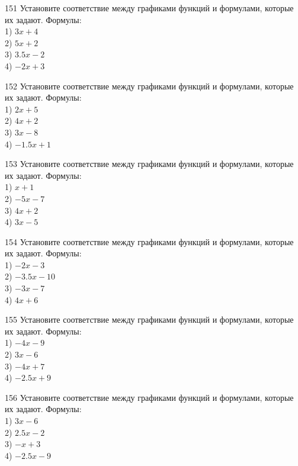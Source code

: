 \documentclass[4apaper]{article}
\begin{document}
\begin{taskBN}{151}
Установите соответствие между графиками функций и формулами, которые их задают. Формулы: \\1) $3x+4$\\2) $5x+2$\\3) $3.5x-2$\\4) $-2x+3$
\end{taskBN}

\begin{taskBN}{152}
Установите соответствие между графиками функций и формулами, которые их задают. Формулы: \\1) $2x+5$\\2) $4x+2$\\3) $3x-8$\\4) $-1.5x+1$
\end{taskBN}

\begin{taskBN}{153}
Установите соответствие между графиками функций и формулами, которые их задают. Формулы: \\1) $x+1$\\2) $-5x-7$\\3) $4x+2$\\4) $3x-5$
\end{taskBN}

\begin{taskBN}{154}
Установите соответствие между графиками функций и формулами, которые их задают. Формулы: \\1) $-2x-3$\\2) $-3.5x-10$\\3) $-3x-7$\\4) $4x+6$
\end{taskBN}

\begin{taskBN}{155}
Установите соответствие между графиками функций и формулами, которые их задают. Формулы: \\1) $-4x-9$\\2) $3x-6$\\3) $-4x+7$\\4) $-2.5x+9$
\end{taskBN}

\begin{taskBN}{156}
Установите соответствие между графиками функций и формулами, которые их задают. Формулы: \\1) $3x-6$\\2) $2.5x-2$\\3) $-x+3$\\4) $-2.5x-9$
\end{taskBN}
\end{document}
